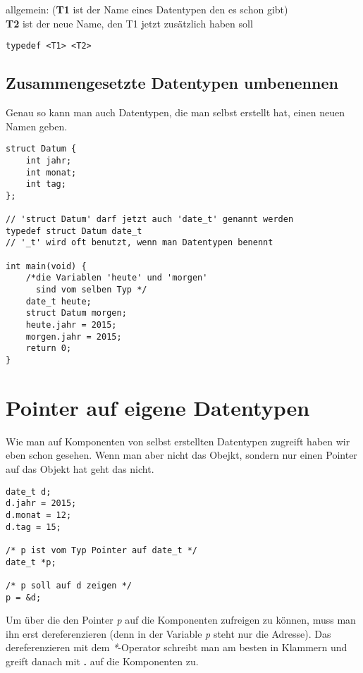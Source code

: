 \documentclass[c_worksheet.tex]{subfiles}
\begin{document}
\begin{tabbing}
allgemein: (\=\textbf{T1} ist der Name eines Datentypen den es schon gibt)\\
            \>\textbf{T2} ist der neue Name, den T1 jetzt zusätzlich haben soll
\end{tabbing}
\begin{lstlisting}[numbers=none]
typedef <T1> <T2>
\end{lstlisting}

\subsection{Zusammengesetzte Datentypen umbenennen}

Genau so kann man auch Datentypen, die man selbst erstellt hat, einen neuen Namen geben.

\begin{lstlisting}
struct Datum {
    int jahr;
    int monat;
    int tag;
};

// 'struct Datum' darf jetzt auch 'date_t' genannt werden
typedef struct Datum date_t
// '_t' wird oft benutzt, wenn man Datentypen benennt

int main(void) {
    /*die Variablen 'heute' und 'morgen'
      sind vom selben Typ */
    date_t heute;
    struct Datum morgen;
    heute.jahr = 2015;
    morgen.jahr = 2015;
    return 0;
}
\end{lstlisting}

\section{Pointer auf eigene Datentypen}

Wie man auf Komponenten von selbst erstellten Datentypen zugreift haben wir eben schon gesehen. Wenn man aber nicht das Obejkt, sondern nur einen Pointer auf das Objekt hat geht das nicht.

\begin{lstlisting}[numbers=none]
date_t d;
d.jahr = 2015;
d.monat = 12;
d.tag = 15;

/* p ist vom Typ Pointer auf date_t */
date_t *p;

/* p soll auf d zeigen */
p = &d;
\end{lstlisting}

Um über die den Pointer \textit{p} auf die Komponenten zufreigen zu können, muss man ihn erst dereferenzieren (denn in der Variable \textit{p} steht nur die Adresse). Das dereferenzieren mit dem \textit{*}-Operator schreibt man am besten in Klammern und greift danach mit \textbf{.} auf die Komponenten zu.
\end{document}
